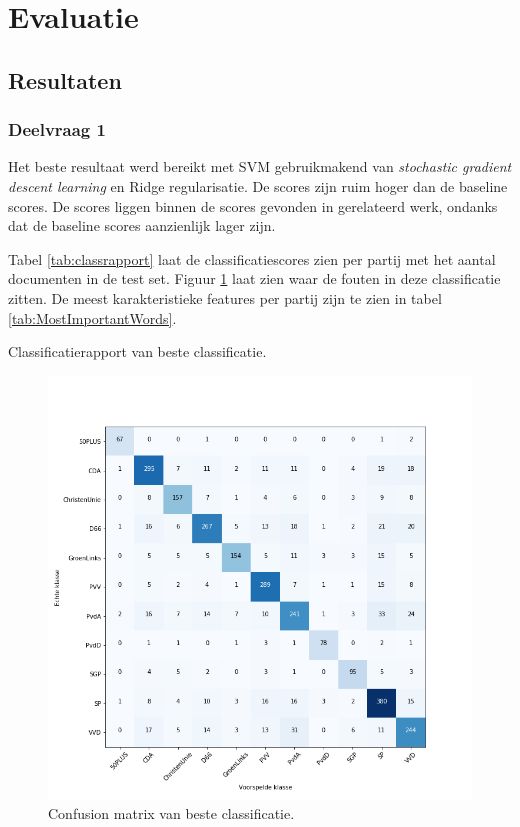 \section{Evaluatie}
\label{sec:eva}

\subsection{Resultaten}

\subsubsection{Deelvraag 1}
Het beste resultaat werd bereikt met SVM gebruikmakend van \textit{stochastic gradient descent learning} en Ridge regularisatie. De scores zijn ruim hoger dan de baseline scores. De scores liggen binnen de scores gevonden in gerelateerd werk, ondanks dat de baseline scores aanzienlijk lager zijn.\par
Tabel \ref{tab:classrapport} laat de classificatiescores zien per partij met het aantal documenten in de test set. Figuur \ref{fig:confusionmatrix} laat zien waar de fouten in deze classificatie zitten. De meest karakteristieke features per partij zijn te zien in tabel \ref{tab:MostImportantWords}.

\begin{table}[H]
\caption{Classificatierapport van beste classificatie.}
\label{tab:classrapport}
\centering

\end{table}


\begin{figure}[H]
  \centering
    \includegraphics[width=0.60\paperwidth]{Verslag/Tables/confusionmatrix.png}
\caption{Confusion matrix van beste classificatie.}
\label{fig:confusionmatrix}
\end{figure}

